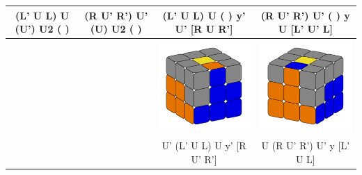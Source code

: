 \documentclass[12pt, a3paper]{article}
\newcommand{\scale}{1}
\begin{document}
\begin{center}
\begin{longtable}{c|c||c|c}
	(L' U L) U (U') U2 ( ) & (R U' R') U' (U) U2 ( ) & (L' U L) U ( ) y' U' [R U R'] & (R U' R') U' ( ) y U [L' U' L] \\
	\hline
	\hline
	& & \includegraphics[scale=\scale]{19l} & \includegraphics[scale=\scale]{19r} \\
	& & U' (L' U L) U y' [R U' R'] & U (R U' R') U' y [L' U L] \\
	\hline
	\end{longtable}
	\begin{tabular}{c|c|c}
		\hline

\end{tabular}
\end{center}
\end{document}
